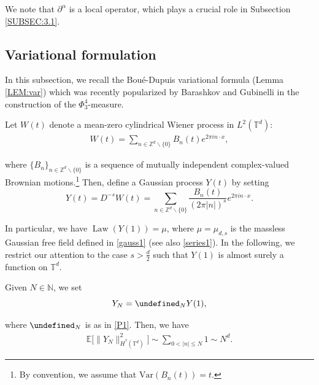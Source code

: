 \documentclass[letterpaper, 11pt,  reqno]{amsart}
\newcommand{\noi}{\noindent}
\newcommand{\T}{\mathbb{T}}
\let\P= \undefined
\newcommand{\P}{\mathbf{P}}
\newcommand{\E}{\mathbb{E}}
\newcommand{\al}{\alpha}
\newcommand{\dd}{\partial}
\newcommand{\N}{\mathbb{N}}
\numberwithin{equation}{section}
\numberwithin{theorem}{section}
\DeclareMathOperator{\Law}{Law}
\begin{document}
\noi
We note that 
$\dd^\al$ is a local operator, 
which plays a crucial role 
in Subsection \ref{SUBSEC:3.1}.



\subsection{Variational formulation}

In this subsection, 
we recall 
the  Bou{\'e}-Dupuis
variational formula 
(Lemma \ref{LEM:var})
which was recently popularized
by Barashkov and Gubinelli \cite{BG}
in the construction of the $\Phi^4_3$-measure.




 Let $W (t)$ denote a mean-zero cylindrical 
 Wiener process in $L^2 (\mathbb{T}^d)$:
\begin{align}
W (t) = \sum_{n \in \mathbb{Z}^d \backslash \{ 0 \}} B_n (t)
e^{2\pi i n \cdot x},
\label{W1}
\end{align}


\noi
where $\{ B_n \}_{n \in \mathbb{Z}^d \backslash \{ 0 \}}$ is a sequence of
mutually independent complex-valued Brownian motions.\footnote{By convention, 
we assume that $\text{Var}(B_n(t)) = t$.} 
Then,  define a 
Gaussian process $Y (t)$ by setting
\begin{equation}
\label{Y1} 
Y (t) = D^{- s} W (t) = \sum_{n \in \mathbb{Z}^d\backslash \{ 0 \}} \frac{B_n (t)}{(2\pi | n |)^s} e^{2\pi i n \cdot x} .
\end{equation}


%
%

\noi
In particular, we have $\Law (Y (1)) = \mu$,
where $\mu = \mu_{d, s}$ is the massless Gaussian 
free field defined in 
\eqref{gauss1} (see also \eqref{series1}).
In the following, we restrict our attention to the case $s > \frac d2$
such that $Y(1)$ is almost surely a function on $\T^d$. 




Given  $N \in \N$, we set 
\begin{equation}
Y_N = \P_{N} Y (1), 
\label{Y2}
\end{equation}


\noi
where $\P_N$ is as in \eqref{P1}.
Then, we have 
\begin{align}
\label{Y3}
\E\big[\|Y_N\|^2_{\dot H^{s}(\T^d)}\big]
\sim \sum_{0<|n|\le N}1
\sim N^d.
\end{align}
\end{document}

